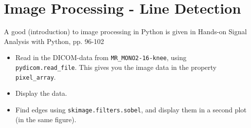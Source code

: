 \documentclass[12pt]{article}
\begin{document}
\section{Image Processing - Line Detection}%

A good (introduction) to image processing in Python is given in Hands-on Signal Analysis with Python, pp. 96-102

\begin{itemize}

    \item Read in the DICOM-data from \lstinline{MR_MONO2-16-knee}, using
        \lstinline{pydicom.read_file}. This gives you the image data in the
        property \lstinline{pixel_array}.

    \item Display the data.

    \item Find edges using \lstinline{skimage.filters.sobel}, and display them
        in a second plot (in the same figure).

\end{itemize}
\end{document}
